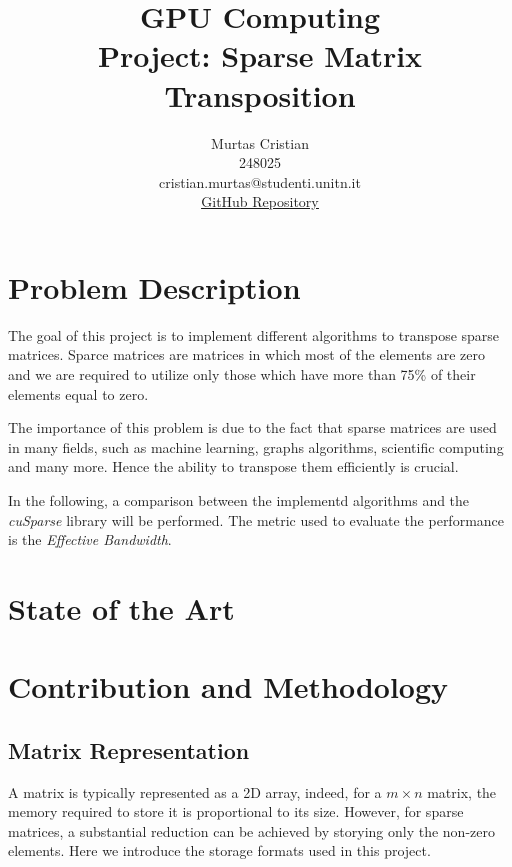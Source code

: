 \documentclass{IEEEconf}
\title{\textbf{GPU Computing} \\
    \large Project: Sparse Matrix Transposition \\
}
\author{Murtas Cristian \\ 248025 \\ cristian.murtas@studenti.unitn.it \\
\underline{\href{https://github.com/SecondarySkyler/gpu-computing/tree/main/cuda_matrix_transposition}{GitHub Repository}}
}
\begin{document}
\maketitle
\begin{abstract}
    
\end{abstract}
\section{Problem Description}
The goal of this project is to implement different algorithms to transpose sparse matrices. 
Sparce matrices are matrices in which most of the elements are zero and we are required
to utilize only those which have more than 75\% of their elements equal to zero.

The importance of this problem is due to the fact that sparse matrices are used in many fields,
such as machine learning, graphs algorithms, scientific computing and many more. Hence the ability to transpose
them efficiently is crucial.

In the following, a comparison between the implementd algorithms and the \textit{cuSparse} \cite{nvidia:cuSparse} library will be performed.
The metric used to evaluate the performance is the \textit{Effective Bandwidth}.
\section{State of the Art}
\section{Contribution and Methodology}
\subsection{Matrix Representation}
A matrix is typically represented as a 2D array, indeed, for a $m \times n$ matrix, the memory required to
store it is proportional to its size. However, for sparse matrices, a substantial reduction can be 
achieved by storying only the non-zero elements. Here we introduce the storage formats used in this project.
\end{document}
